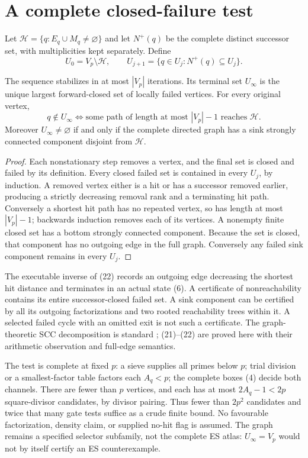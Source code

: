\section{A complete closed-failure test}
Let $\mathscr H=\{q:E_q\cup M_q\ne\varnothing\}$ and let $N^+(q)$ be the
complete distinct successor set, with multiplicities kept separately.
Define
\[
 U_0=V_p\setminus\mathscr H,\qquad
 U_{j+1}=\{q\in U_j:N^+(q)\subseteq U_j\}.               \tag{21}
\]
\begin{theorem}\label{thm:closure}
The sequence stabilizes in at most $|V_p|$ iterations. Its terminal set $U_\infty$
is the unique largest forward-closed set of locally failed vertices. For every
original vertex,
\[
 \boxed{q\notin U_\infty\iff
 \text{some path of length at most }|V_p|-1\text{ reaches }\mathscr H.}
                                                               \tag{22}
\]
Moreover $U_\infty\ne\varnothing$ if and only if the complete directed graph
has a sink strongly connected component disjoint from $\mathscr H$.
\end{theorem}
\begin{proof}
Each nonstationary step removes a vertex, and the final set is closed and
failed by its definition. Every closed failed set is contained in every $U_j$,
by induction. A removed vertex either is a hit or has a successor removed
earlier, producing a strictly decreasing removal rank and a terminating hit
path. Conversely a shortest hit path has no repeated vertex, so has length at
most $|V_p|-1$; backwards induction removes each of its vertices.
A nonempty finite closed set has a bottom strongly connected component. Because
the set is closed, that component has no outgoing edge in the full graph.
Conversely any failed sink component remains in every $U_j$.
\end{proof}

The executable inverse of (22) records an outgoing edge decreasing the shortest
hit distance and terminates in an actual state (6). A certificate of nonreachability
contains its entire successor-closed failed set. A sink component can be certified
by all its outgoing factorizations and two rooted reachability trees within it.
A selected failed cycle with an omitted exit is not such a certificate.
The graph-theoretic SCC decomposition is standard \cite[Theorems 3.10 and 5.2]{Tarjan}; (21)--(22)
are proved here with their arithmetic observation and full-edge semantics.

The test is complete at fixed $p$: a sieve supplies all primes below $p$;
trial division or a smallest-factor table factors each $A_q<p$; the complete
boxes (4) decide both channels. There are fewer than $p$ vertices, and each
has at most $2A_q-1<2p$ square-divisor candidates, by divisor pairing. Thus fewer
than $2p^2$ candidates and twice that many gate tests suffice as a crude finite
bound. No favourable factorization, density claim, or supplied no-hit flag
is assumed. The graph remains a specified selector subfamily, not the complete
ES atlas: $U_\infty=V_p$ would not by itself certify an ES counterexample.

